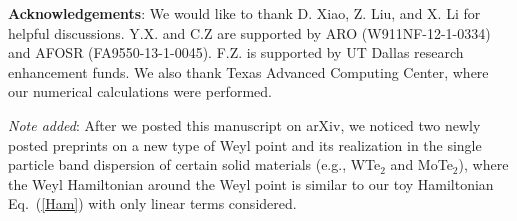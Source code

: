 \documentclass[prl,aps,twocolumn,showpacs,floatfix]{revtex4}
\begin{document}
\begin{acknowledgments}
\textbf{Acknowledgements}: We would like to thank D. Xiao, Z. Liu, and X. Li
for helpful discussions. Y.X. and C.Z are supported by ARO
(W911NF-12-1-0334) and AFOSR (FA9550-13-1-0045). F.Z. is supported by UT
Dallas research enhancement funds. We also thank Texas Advanced Computing
Center, where our numerical calculations were performed.
\end{acknowledgments}

\begin{acknowledgments}
\textit{Note added}: After we posted this manuscript on arXiv, we noticed
two newly posted preprints \cite{DaiXi2015,Sun2015} on a new type of Weyl
point and its realization in the single particle band dispersion of certain
solid materials (e.g., WTe$_{2}$ and MoTe$_2$), where the Weyl Hamiltonian
around the Weyl point is similar to our toy Hamiltonian Eq.~(\ref{Ham}) with
only linear terms considered.
\end{acknowledgments}
\end{document}
